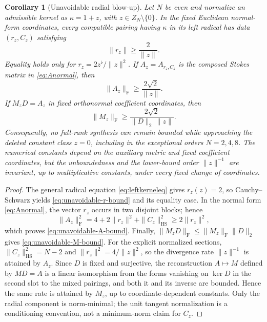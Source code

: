 \documentclass[11pt,a4paper]{article}
\newtheorem{corollary}[theorem]{Corollary}
\theoremstyle{definition}
\theoremstyle{remark}
\newcommand{\Ker}{\operatorname{ker}}
\begin{document}
\begin{corollary}[Unavoidable radial blow-up]\label{cor:radialblowup}
Let $N$ be even and normalize an admissible kernel as $\kappa=1+z$, with
$z\in Z_N\setminus\{0\}$.  In the fixed Euclidean normal-form coordinates, every compatible
pairing having $\kappa$ in its left radical has data $(r_z,C_z)$ satisfying
\begin{equation}\label{eq:unavoidable-r-bound}
 \boxed{\|r_z\|\geq\frac{2}{\|z\|}.}
\end{equation}
Equality holds only for $r_z=2z^\flat/\|z\|^2$.  If $A_z=A_{r_z,C_z}$ is the composed
Stokes matrix in \eqref{eq:Anormal}, then
\begin{equation}\label{eq:unavoidable-A-bound}
 \boxed{\|A_z\|_{\mathrm F}\geq\frac{2\sqrt2}{\|z\|}.}
\end{equation}
If $M_zD=A_z$ in fixed orthonormal coefficient coordinates, then
\begin{equation}\label{eq:unavoidable-M-bound}
 \boxed{\|M_z\|_{\mathrm F}
 \geq\frac{2\sqrt2}{\|D\|_2\,\|z\|}.}
\end{equation}
Consequently, no full-rank synthesis can remain bounded while approaching the deleted
constant class $z=0$, including in the exceptional orders $N=2,4,8$.
The numerical constants depend on the auxiliary metric and fixed coefficient coordinates,
but the unboundedness and the lower-bound order $\|z\|^{-1}$ are invariant, up to
multiplicative constants, under every fixed change of coordinates.
\end{corollary}

\begin{proof}
The general radical equation \eqref{eq:leftkerneleq} gives $r_z(z)=2$, so Cauchy--Schwarz yields
\eqref{eq:unavoidable-r-bound} and its equality case.  In the normal form
\eqref{eq:Anormal}, the vector $r_z$ occurs in two disjoint blocks; hence
\[
 \|A_z\|_{\mathrm F}^2
 =4+2\|r_z\|^2+\|C_z\|_{\mathrm{HS}}^2
 \geq2\|r_z\|^2,
\]
which proves \eqref{eq:unavoidable-A-bound}.  Finally,
$\|M_zD\|_{\mathrm F}\leq\|M_z\|_{\mathrm F}\|D\|_2$ gives
\eqref{eq:unavoidable-M-bound}.  For the explicit normalized sections,
$\|C_z\|_{\mathrm{HS}}^2=N-2$ and $\|r_z\|^2=4/\|z\|^2$, so the divergence rate
$\|z\|^{-1}$ is attained by $A_z$.  Since $D$ is fixed and surjective, the reconstruction
$A\mapsto M$ defined by $MD=A$ is a linear isomorphism from the forms vanishing on $\Ker D$
in the second slot to the mixed pairings, and both it and its inverse are bounded.  Hence the
same rate is attained by $M_z$, up to coordinate-dependent constants.  Only the radial
component is norm-minimal; the unit tangent normalization is a conditioning convention, not a
minimum-norm claim for $C_z$.
\end{proof}
\end{document}
